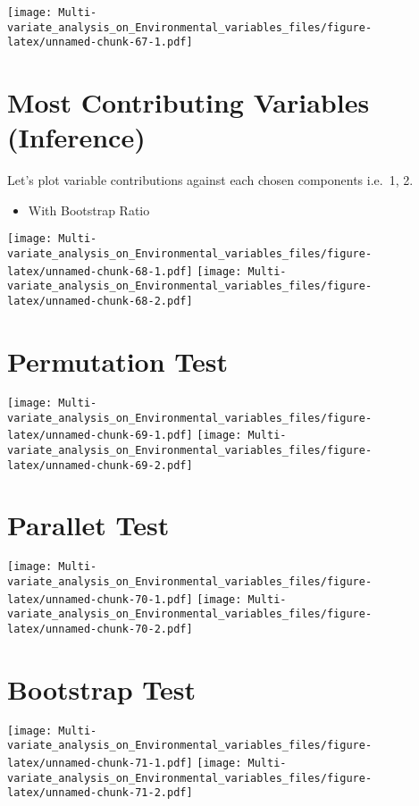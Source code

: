 \documentclass[]{book}
\providecommand{\tightlist}{%
  \setlength{\itemsep}{0pt}\setlength{\parskip}{0pt}}
\begin{document}
\texttt{[image: Multi-variate\_analysis\_on\_Environmental\_variables\_files/figure-latex/unnamed-chunk-67-1.pdf]}

\hypertarget{most-contributing-variables-inference-1}{%
\section{Most Contributing Variables
(Inference)}\label{most-contributing-variables-inference-1}}

Let's plot variable contributions against each chosen components i.e.~1,
2.

\begin{itemize}
\tightlist
\item
  With Bootstrap Ratio
\end{itemize}

\texttt{[image: Multi-variate\_analysis\_on\_Environmental\_variables\_files/figure-latex/unnamed-chunk-68-1.pdf]}
\texttt{[image: Multi-variate\_analysis\_on\_Environmental\_variables\_files/figure-latex/unnamed-chunk-68-2.pdf]}

\hypertarget{permutation-test-3}{%
\section{Permutation Test}\label{permutation-test-3}}

\texttt{[image: Multi-variate\_analysis\_on\_Environmental\_variables\_files/figure-latex/unnamed-chunk-69-1.pdf]}
\texttt{[image: Multi-variate\_analysis\_on\_Environmental\_variables\_files/figure-latex/unnamed-chunk-69-2.pdf]}

\hypertarget{parallet-test-3}{%
\section{Parallet Test}\label{parallet-test-3}}

\texttt{[image: Multi-variate\_analysis\_on\_Environmental\_variables\_files/figure-latex/unnamed-chunk-70-1.pdf]}
\texttt{[image: Multi-variate\_analysis\_on\_Environmental\_variables\_files/figure-latex/unnamed-chunk-70-2.pdf]}

\hypertarget{bootstrap-test-3}{%
\section{Bootstrap Test}\label{bootstrap-test-3}}

\texttt{[image: Multi-variate\_analysis\_on\_Environmental\_variables\_files/figure-latex/unnamed-chunk-71-1.pdf]}
\texttt{[image: Multi-variate\_analysis\_on\_Environmental\_variables\_files/figure-latex/unnamed-chunk-71-2.pdf]}
\end{document}
